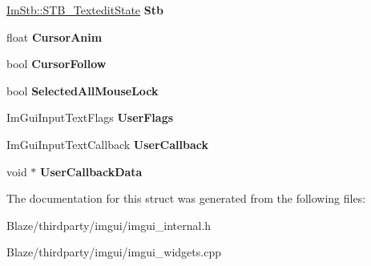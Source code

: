 \begin{DoxyCompactItemize}
\hyperlink{structImStb_1_1STB__TexteditState}{Im\+Stb\+::\+S\+T\+B\+\_\+\+Textedit\+State} {\bfseries Stb}
\item 
\mbox{\label{structImGuiInputTextState_a95520b8289da18da2ca6480a64894516}} 
float {\bfseries Cursor\+Anim}
\item 
\mbox{\label{structImGuiInputTextState_a8cfd858a20e7154e235cc6288fdae6f0}} 
bool {\bfseries Cursor\+Follow}
\item 
\mbox{\label{structImGuiInputTextState_a3ea23fdc7d6cc4983230055ba92bc422}} 
bool {\bfseries Selected\+All\+Mouse\+Lock}
\item 
\mbox{\label{structImGuiInputTextState_a413a224016ccd2566de885d43445e976}} 
Im\+Gui\+Input\+Text\+Flags {\bfseries User\+Flags}
\item 
\mbox{\label{structImGuiInputTextState_a416393864f1b6dbe9f446b197eb5e196}} 
Im\+Gui\+Input\+Text\+Callback {\bfseries User\+Callback}
\item 
\mbox{\label{structImGuiInputTextState_a5b7922443d0aac7e81957cbf9ef64845}} 
void $\ast$ {\bfseries User\+Callback\+Data}
\end{DoxyCompactItemize}


The documentation for this struct was generated from the following files\+:\begin{DoxyCompactItemize}
\item 
Blaze/thirdparty/imgui/imgui\+\_\+internal.\+h\item 
Blaze/thirdparty/imgui/imgui\+\_\+widgets.\+cpp\end{DoxyCompactItemize}
